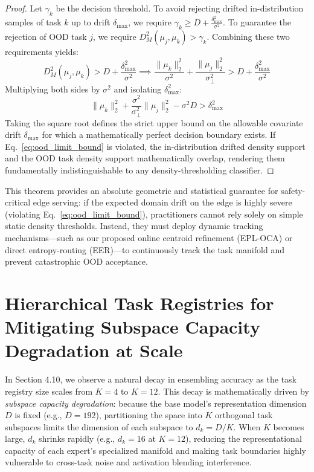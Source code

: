 \documentclass{article}
\theoremstyle{plain}
\theoremstyle{definition}
\theoremstyle{remark}
\begin{document}
\begin{proof}
Let $\gamma_k$ be the decision threshold. To avoid rejecting drifted in-distribution samples of task $k$ up to drift $\delta_{\max}$, we require $\gamma_k \ge D + \frac{\delta_{\max}^2}{\sigma^2}$. To guarantee the rejection of OOD task $j$, we require $D_M^2(\mu_j, \mu_k) > \gamma_k$. Combining these two requirements yields:
\begin{equation}
D_M^2(\mu_j, \mu_k) > D + \frac{\delta_{\max}^2}{\sigma^2} \implies \frac{\|\mu_k\|_2^2}{\sigma^2} + \frac{\|\mu_j\|_2^2}{\sigma_\perp^2} > D + \frac{\delta_{\max}^2}{\sigma^2}
\end{equation}
Multiplying both sides by $\sigma^2$ and isolating $\delta_{\max}^2$:
\begin{equation}
\|\mu_k\|_2^2 + \frac{\sigma^2}{\sigma_\perp^2} \|\mu_j\|_2^2 - \sigma^2 D > \delta_{\max}^2
\end{equation}
Taking the square root defines the strict upper bound on the allowable covariate drift $\delta_{\max}$ for which a mathematically perfect decision boundary exists. If Eq.~\ref{eq:ood_limit_bound} is violated, the in-distribution drifted density support and the OOD task density support mathematically overlap, rendering them fundamentally indistinguishable to any density-thresholding classifier.
\end{proof}

This theorem provides an absolute geometric and statistical guarantee for safety-critical edge serving: if the expected domain drift on the edge is highly severe (violating Eq.~\ref{eq:ood_limit_bound}), practitioners cannot rely solely on simple static density thresholds. Instead, they must deploy dynamic tracking mechanisms—such as our proposed online centroid refinement (EPL-OCA) or direct entropy-routing (EER)—to continuously track the task manifold and prevent catastrophic OOD acceptance.

\section{Hierarchical Task Registries for Mitigating Subspace Capacity Degradation at Scale}
\label{app:hierarchical_registries}

In Section 4.10, we observe a natural decay in ensembling accuracy as the task registry size scales from $K=4$ to $K=12$. This decay is mathematically driven by \emph{subspace capacity degradation}: because the base model's representation dimension $D$ is fixed (e.g., $D=192$), partitioning the space into $K$ orthogonal task subspaces limits the dimension of each subspace to $d_k = D / K$. When $K$ becomes large, $d_k$ shrinks rapidly (e.g., $d_k = 16$ at $K=12$), reducing the representational capacity of each expert's specialized manifold and making task boundaries highly vulnerable to cross-task noise and activation blending interference.
\end{document}
